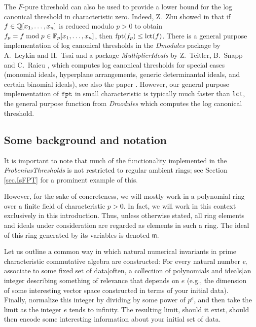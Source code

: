 \documentclass{amsart}
\newcommand{\idealm}{\mathfrak{m}}
\begin{document}
The $F$-pure threshold can also be used to provide a lower bound for the log canonical threshold in characteristic zero.  Indeed, Z.~Zhu showed in \cite[Corollary 4.2]{ZhuLogCanoincalThresholdsInPositiveChar} that if $f \in \mathbb{Q}[x_1, \dots, x_n]$ is reduced modulo $p > 0$ to obtain $f_p = f\;\mathrm{mod}\;p \in \mathbb{F}_p[x_1, \dots, x_n]$, then $\operatorname{{fpt}}(f_p) \leq \operatorname{{lct}}(f)$.  There is a general purpose implementation of log canonical thresholds in the \emph{Dmodules} package by A.~Leykin and H.~Tsai \cite{DmodulesSource} and a package \emph{MultiplierIdeals} by Z.~Teitler, B.~Snapp and C.~Raicu \cite{MultiplierIdealsPackage}, which computes log canonical thresholds for special cases (monomial ideals, hyperplane arrangements, generic determinantal ideals, and certain binomial ideals), see also the paper \cite{MultiplierIdealsArticle}.  However, our general purpose implementation of ${\tt fpt}$ in small characteristic is typically much faster than {\tt lct}, the general purpose function from \emph{Dmodules} which computes the log canonical threshold.

\subsection*{Some background and notation}
It is important to note that much of the functionality implemented in the \emph{FrobeniusThresholds} is not restricted to regular ambient rings; see Section \ref{sec.IsFPT} for a prominent example of this.

However, for the sake of concreteness, we will mostly work in a polynomial ring over a finite field of  characteristic $p>0$.  In fact,  we will work in this context exclusively in this introduction.  Thus, unless otherwise stated, all ring elements and ideals under consideration are regarded as elements in such a ring.  The ideal of this ring generated by its variables is denoted $\idealm$.

Let us outline a common way in which natural numerical invariants in prime characteristic commutative algebra are constructed:  For every natural number $e$, associate to some fixed set of data|often, a collection of polynomials and ideals|an integer describing something of relevance that depends on $e$ (e.g., the dimension of some interesting vector space constructed in terms of your initial data).   Finally, normalize this integer by dividing by some power of $p^e$, and then take the limit as the integer $e$ tends to infinity.  The resulting limit, should it exist, should then encode some interesting information about your initial set of data.
\end{document}
